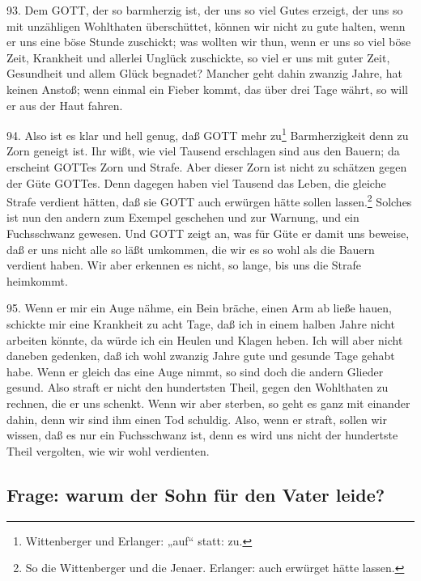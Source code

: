 93. Dem GOTT, der so barmherzig ist, der uns so viel Gutes erzeigt, der uns so mit unzähligen Wohlthaten überschüttet, können wir nicht zu gute halten, wenn er uns eine böse Stunde zuschickt; was wollten wir thun, wenn er uns so viel böse Zeit, Krankheit und allerlei Unglück zuschickte, so viel er uns mit guter Zeit, Gesundheit und allem Glück begnadet? Mancher geht dahin zwanzig Jahre, hat keinen Anstoß; wenn einmal ein Fieber kommt, das über drei Tage währt, so will er aus der Haut fahren.

94. Also ist es klar und hell genug, daß GOTT mehr zu\footnote{Wittenberger und Erlanger: „auf“ statt: zu.} Barmherzigkeit denn zu Zorn geneigt ist. Ihr wißt, wie viel Tausend erschlagen sind aus den Bauern; da erscheint GOTTes Zorn und Strafe. Aber dieser Zorn ist nicht zu schätzen gegen der Güte GOTTes. Denn dagegen haben viel Tausend das Leben, die gleiche Strafe verdient hätten, daß sie GOTT auch erwürgen hätte sollen lassen.\footnote{So die Wittenberger und die Jenaer. Erlanger: auch erwürget hätte lassen.} Solches ist nun den andern zum Exempel geschehen und zur Warnung, und ein Fuchsschwanz gewesen. Und GOTT zeigt an, was für Güte er damit uns beweise, daß er uns nicht alle so läßt umkommen, die wir es so wohl als die Bauern verdient haben. Wir aber erkennen es nicht, so lange, bis uns die Strafe heimkommt.

95. Wenn er mir ein Auge nähme, ein Bein bräche, einen Arm ab ließe hauen, schickte mir eine Krankheit zu acht Tage, daß ich in einem halben Jahre nicht arbeiten könnte, da würde ich ein Heulen und Klagen heben. Ich will aber nicht daneben gedenken, daß ich wohl zwanzig Jahre gute und gesunde Tage gehabt habe. Wenn er gleich das eine Auge nimmt, so sind doch die andern Glieder gesund. Also straft er nicht den hundertsten Theil, gegen den Wohlthaten zu rechnen, die er uns schenkt. Wenn wir aber sterben, so geht es ganz mit einander dahin, denn wir sind ihm einen Tod schuldig. Also, wenn er straft, sollen wir wissen, daß es nur ein Fuchsschwanz ist, denn es wird uns nicht der hundertste Theil vergolten, wie wir wohl verdienten.

\subsection{Frage: warum der Sohn für den Vater leide?}

